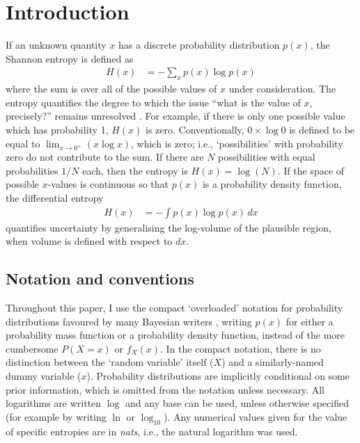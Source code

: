 \documentclass[entropy,article,accept,oneauthor,pdftex,10pt,a4paper]{mdpi}
\begin{document}

\section{Introduction}

If an unknown quantity $x$ has a discrete probability distribution $p(x)$,
the Shannon entropy \citep{shannon} is defined as
\begin{align}
H(x) &= -\sum_{x} p(x) \log p(x)
\end{align}
where the sum is over all of the possible values of $x$ under consideration.
The entropy quantifies the degree to which the issue
``what is the value of $x$, precisely?'' remains unresolved
\citep{knuth_questions}. For example,
if there is only one possible value which has probability 1, $H(x)$ is
zero. Conventionally, $0 \times \log 0$ is defined to be equal
to $\lim_{x \to 0^+} (x\log x)$, which is zero; i.e., `possibilities' with
probability zero do not contribute to the sum.
If there are $N$ possibilities with equal probabilities $1/N$ each,
then the entropy is $H(x) = \log(N)$.
If the space of possible $x$-values is continuous so that $p(x)$ is a
probability density function, the differential entropy
\begin{align}
H(x) &= -\int p(x) \log p(x) \, dx
\end{align}
quantifies uncertainty by generalising the log-volume
of the plausible region, when volume is defined with respect to $dx$.

\subsection{Notation and conventions}

Throughout this paper, I use the compact
`overloaded' notation for probability distributions favoured by many
Bayesian writers \citep{jaynes2003probability, mackay2003information},
writing $p(x)$ for either a probability mass function
or a probability density function, instead
of the more cumbersome $P(X=x)$ or $f_X(x)$.
In the compact notation, there is no distinction between the
`random variable' itself ($X$) and a similarly-named dummy variable ($x$).
Probability distributions are implicitly conditional on some prior
information, which is omitted from the notation unless necessary.
All logarithms are written $\log$ and any base can be used, unless otherwise
specified (for example by writing $\ln$ or $\log_{10}$). Any numerical
values given for the value of specific entropies are in {\em nats}, i.e.,
the natural logarithm was used.
\end{document}
